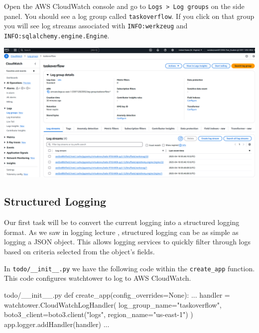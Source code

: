 \documentclass{csse4400}
\begin{document}
Open the AWS CloudWatch console and go to \texttt{Logs > Log groups} on the side panel.
You should see a log group called \texttt{taskoverflow}.
If you click on that group you will see log streams associated with \texttt{INFO:werkzeug}
and \texttt{INFO:sqlalchemy.engine.Engine}.

\begin{center}
    \includegraphics[width=\textwidth]{images/log-group}
\end{center}

\subsection{Structured Logging}

Our first task will be to convert the current logging into a structured logging format.
As we saw in logging lecture \cite{logging-slides}, structured logging can be as simple as logging a JSON object.
This allows logging services to quickly filter through logs based on criteria selected from the object's fields.

In \texttt{todo/\_\_init\_\_.py} we have the following code within the \texttt{create\_app} function.
This code configures watchtower to log to AWS CloudWatch.
%
\begin{code}[language=python,numbers=none]{todo/\_\_init\_\_.py}
def create_app(config_overrides=None): 
    ...
    handler = watchtower.CloudWatchLogHandler(
        log_group_name="taskoverflow",
        boto3_client=boto3.client("logs", region_name="us-east-1")
    )
    app.logger.addHandler(handler)
    ...
\end{code}
\end{document}
